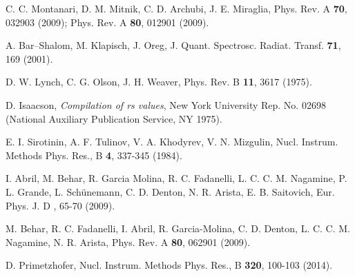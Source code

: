 \begin{thebibliography}{9}
C. C. Montanari, D. M. Mitnik, C. D. Archubi, J. E. Miraglia, 
Phys. Rev. A \textbf{70}, 032903 (2009); 
Phys. Rev. A \textbf{80}, 012901 (2009).

\begin{comment}

\bibitem{Montanari:09}
C. C. Montanari, C. D. Archubi, D. M. Mitnik, J. E. Miraglia,
Phys. Rev. A \textbf{79}, 032903 (2009);

\bibitem{Montanari:11}
C.C. Montanari, D. M. Mitnik, J. E. Miraglia,
Rad. Eff. Defects Sol. \textbf{166}, 338 (2011).

\bibitem{Oswald:18}
M. Oswal, Sunil Kumar, Udai Singh, G. Singhe, K. P. Singh, D. Mehta,
D. Mitnik, C. C. Montanari, T.Nandi,
Nucl. Instrum. Methods Phys. Res., B \textbf{416}, 110 (2018).

\bibitem{Montanari:19}
A. M. P. Mendez, C. C. Montanari, D. M. Mitnik, J. E. Miraglia,
\textit{en preparación}.

\end{comment}


A. Bar--Shalom, M. Klapisch, J. Oreg,
J. Quant. Spectrosc. Radiat. Transf. \textbf{71}, 169 (2001).

D. W. Lynch, C. G. Olson, J. H. Weaver,
Phys. Rev. B \textbf{11}, 3617 (1975).

D. Isaacson,
\textit{Compilation of rs values}, New York University Rep. No. 02698
(National Auxiliary Publication Service, NY 1975).


E. I. Sirotinin, A. F. Tulinov, V. A. Khodyrev, V. N. Mizgulin, 
Nucl. Instrum. Methods Phys. Res., B \textbf{4}, 337-345 (1984).

I. Abril, M. Behar, R. Garcia Molina, R. C. Fadanelli, L. C. C. M. Nagamine, 
P. L. Grande, L. Sch\"unemann, C. D. Denton, N. R. Arista, E. B. Saitovich,
Eur. Phys. J. D , 65-70 (2009).

M. Behar, R. C. Fadanelli, I. Abril, R. Garcia-Molina, C. D. Denton, 
L. C. C. M. Nagamine, N. R. Arista, 
Phys. Rev. A \textbf{80},  062901 (2009).

D. Primetzhofer, 
Nucl. Instrum. Methods Phys. Res., B \textbf{320}, 100-103 (2014).


\end{thebibliography}
